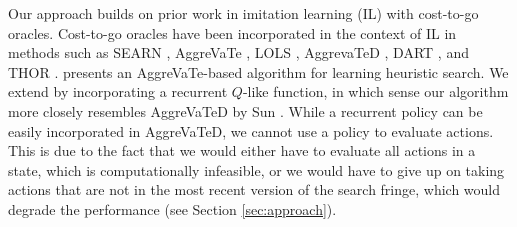  Our approach builds on prior work in imitation learning (IL) with cost-to-go oracles. Cost-to-go oracles have been incorporated in the context of IL in methods such as SEARN \cite{daume2009search}, AggreVaTe \cite{ross2014reinforcement}, LOLS \cite{chang2015learning}, AggrevaTeD \cite{sun2017deeply}, DART \cite{laskey2017dart}, and THOR \cite{sun2018truncated}. \sail \cite{bhardwaj2017learning} presents an AggreVaTe-based algorithm for learning heuristic search. We extend \sail by incorporating a recurrent $Q$-like function, in which sense our algorithm more closely resembles AggreVaTeD by Sun \etal \cite{sun2017deeply}. While a recurrent policy can be easily incorporated in AggreVaTeD, we cannot use a policy to evaluate actions. This is due to the fact that we would either have to evaluate all actions in a state, which is computationally infeasible, or we would have to give up on taking actions that are not in the most recent version of the search fringe, which would degrade the performance (see Section \ref{sec:approach}). %

